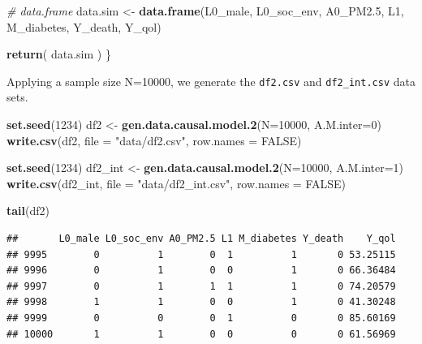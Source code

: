 \documentclass[
]{book}
\newenvironment{Shaded}{\begin{snugshade}}{\end{snugshade}}
\newcommand{\AttributeTok}[1]{\textcolor[rgb]{0.13,0.29,0.53}{#1}}
\newcommand{\CommentTok}[1]{\textcolor[rgb]{0.56,0.35,0.01}{\textit{#1}}}
\newcommand{\ConstantTok}[1]{\textcolor[rgb]{0.56,0.35,0.01}{#1}}
\newcommand{\DecValTok}[1]{\textcolor[rgb]{0.00,0.00,0.81}{#1}}
\newcommand{\FloatTok}[1]{\textcolor[rgb]{0.00,0.00,0.81}{#1}}
\newcommand{\FunctionTok}[1]{\textcolor[rgb]{0.13,0.29,0.53}{\textbf{#1}}}
\newcommand{\NormalTok}[1]{#1}
\newcommand{\OtherTok}[1]{\textcolor[rgb]{0.56,0.35,0.01}{#1}}
\newcommand{\StringTok}[1]{\textcolor[rgb]{0.31,0.60,0.02}{#1}}
\begin{document}
\begin{Shaded}
\begin{Highlighting}[]
  \CommentTok{\# data.frame}
\NormalTok{  data.sim }\OtherTok{\textless{}{-}} \FunctionTok{data.frame}\NormalTok{(L0\_male, L0\_soc\_env, A0\_PM2}\FloatTok{.5}\NormalTok{, L1, M\_diabetes, }
\NormalTok{                         Y\_death, Y\_qol)}

  \FunctionTok{return}\NormalTok{( data.sim )}
\NormalTok{\}}
\end{Highlighting}
\end{Shaded}

Applying a sample size N=10000, we generate the \texttt{df2.csv} and \texttt{df2\_int.csv} data sets.

\begin{Shaded}
\begin{Highlighting}[]
\FunctionTok{set.seed}\NormalTok{(}\DecValTok{1234}\NormalTok{)}
\NormalTok{df2 }\OtherTok{\textless{}{-}} \FunctionTok{gen.data.causal.model.2}\NormalTok{(}\AttributeTok{N=}\DecValTok{10000}\NormalTok{, }\AttributeTok{A.M.inter=}\DecValTok{0}\NormalTok{)}
\FunctionTok{write.csv}\NormalTok{(df2, }\AttributeTok{file =} \StringTok{"data/df2.csv"}\NormalTok{, }\AttributeTok{row.names =} \ConstantTok{FALSE}\NormalTok{)}

\FunctionTok{set.seed}\NormalTok{(}\DecValTok{1234}\NormalTok{)}
\NormalTok{df2\_int }\OtherTok{\textless{}{-}} \FunctionTok{gen.data.causal.model.2}\NormalTok{(}\AttributeTok{N=}\DecValTok{10000}\NormalTok{, }\AttributeTok{A.M.inter=}\DecValTok{1}\NormalTok{)}
\FunctionTok{write.csv}\NormalTok{(df2\_int, }\AttributeTok{file =} \StringTok{"data/df2\_int.csv"}\NormalTok{, }\AttributeTok{row.names =} \ConstantTok{FALSE}\NormalTok{)}
\end{Highlighting}
\end{Shaded}

\begin{Shaded}
\begin{Highlighting}[]
\FunctionTok{tail}\NormalTok{(df2)}
\end{Highlighting}
\end{Shaded}

\begin{verbatim}
##       L0_male L0_soc_env A0_PM2.5 L1 M_diabetes Y_death    Y_qol
## 9995        0          1        0  1          1       0 53.25115
## 9996        0          1        0  0          1       0 66.36484
## 9997        0          1        1  1          1       0 74.20579
## 9998        1          1        0  0          1       0 41.30248
## 9999        0          0        0  1          0       0 85.60169
## 10000       1          1        0  0          0       0 61.56969
\end{verbatim}
\end{document}
